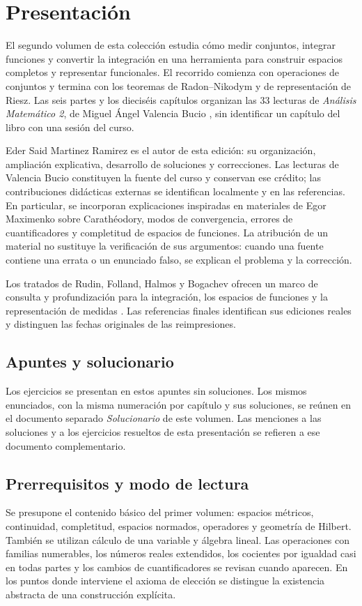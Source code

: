 \chapter*{Presentación}
El segundo volumen de esta colección estudia cómo medir conjuntos, integrar funciones y convertir la integración en una herramienta para construir espacios completos y representar funcionales. El recorrido comienza con operaciones de conjuntos y termina con los teoremas de Radon--Nikodym y de representación de Riesz. Las seis partes y los dieciséis capítulos organizan las 33 lecturas de \emph{Análisis Matemático 2}, de Miguel Ángel Valencia Bucio \cite{valencia2}, sin identificar un capítulo del libro con una sesión del curso.

Eder Said Martinez Ramirez es el autor de esta edición: su organización, ampliación explicativa, desarrollo de soluciones y correcciones. Las lecturas de Valencia Bucio constituyen la fuente del curso y conservan ese crédito; las contribuciones didácticas externas se identifican localmente y en las referencias. En particular, se incorporan explicaciones inspiradas en materiales de Egor Maximenko sobre Carathéodory, modos de convergencia, errores de cuantificadores y completitud de espacios de funciones. La atribución de un material no sustituye la verificación de sus argumentos: cuando una fuente contiene una errata o un enunciado falso, se explican el problema y la corrección.

Los tratados de Rudin, Folland, Halmos y Bogachev ofrecen un marco de consulta y profundización para la integración, los espacios de funciones y la representación de medidas \cite{rudin1987,folland1999,halmos1950,bogachev2007}. Las referencias finales identifican sus ediciones reales y distinguen las fechas originales de las reimpresiones.

\section*{Apuntes y solucionario}
Los ejercicios se presentan en estos apuntes sin soluciones. Los mismos
enunciados, con la misma numeración por capítulo y sus soluciones, se reúnen
en el documento separado \emph{Solucionario} de este volumen. Las menciones
a las soluciones y a los ejercicios resueltos de esta presentación se refieren
a ese documento complementario.

\section*{Prerrequisitos y modo de lectura}
Se presupone el contenido básico del primer volumen: espacios métricos, continuidad, completitud, espacios normados, operadores y geometría de Hilbert. También se utilizan cálculo de una variable y álgebra lineal. Las operaciones con familias numerables, los números reales extendidos, los cocientes por igualdad casi en todas partes y los cambios de cuantificadores se revisan cuando aparecen. En los puntos donde interviene el axioma de elección se distingue la existencia abstracta de una construcción explícita.

